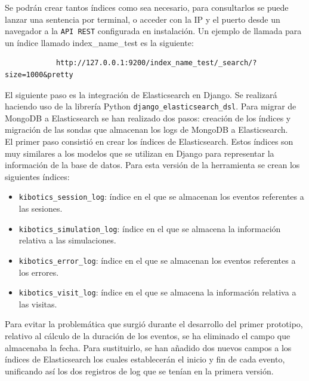 \documentclass[a4paper, 12pt]{book}
\begin{document}
		Se podrán crear tantos índices como sea necesario, para consultarlos se puede lanzar una sentencia por terminal, o acceder con la IP y el puerto desde un navegador a la \texttt{API REST} configurada en instalación. Un ejemplo de llamada para un índice llamado index\_name\_test es la siguiente:
		
		{\footnotesize
		\begin{verbatim}
			http://127.0.0.1:9200/index_name_test/_search/?size=1000&pretty
		\end{verbatim}
		}
		
		El siguiente paso es la integración de Elasticsearch en Django. Se realizará haciendo uso de la librería Python \texttt{django\_elasticsearch\_dsl}. Para migrar de MongoDB a Elasticsearch se han realizado dos pasos: creación de los índices y migración de las sondas que almacenan los logs de MongoDB a Elasticsearch.\\
		
		
		El primer paso consistió en crear los índices de Elasticsearch. Estos índices son muy similares a los modelos que se utilizan en Django para representar la información de la base de datos. Para esta versión de la herramienta se crean los siguientes índices: 				
		
		\begin{itemize}
			\item \texttt{kibotics\_session\_log}: índice en el que se almacenan los eventos referentes a las sesiones.
			
			\item \texttt{kibotics\_simulation\_log}: índice en el que se almacena la información relativa a las simulaciones.
			
			\item \texttt{kibotics\_error\_log}: índice en el que se almacenan los eventos referentes a los errores.
			
			\item \texttt{kibotics\_visit\_log}: índice en el que se almacena la información relativa a las visitas.
		\end{itemize}				
		
		Para evitar la problemática que surgió durante el desarrollo del primer prototipo, relativo al cálculo de la duración de los eventos, se ha eliminado el campo que almacenaba la fecha. Para sustituirlo, se han añadido dos nuevos campos a los índices de Elasticsearch los cuales establecerán el inicio y fin de cada evento, unificando así los dos registros de log que se tenían en la primera versión.\\
		
\end{document}
